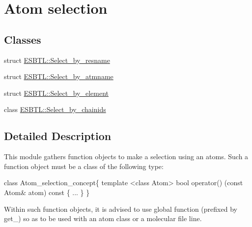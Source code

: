 \hypertarget{group__atomsel}{}\section{Atom selection}
\label{group__atomsel}
\subsection*{Classes}
\begin{DoxyCompactItemize}
\item 
struct \hyperlink{structESBTL_1_1Select__by__resname}{E\+S\+B\+T\+L\+::\+Select\+\_\+by\+\_\+resname}
\item 
struct \hyperlink{structESBTL_1_1Select__by__atmname}{E\+S\+B\+T\+L\+::\+Select\+\_\+by\+\_\+atmname}
\item 
struct \hyperlink{structESBTL_1_1Select__by__element}{E\+S\+B\+T\+L\+::\+Select\+\_\+by\+\_\+element}
\item 
class \hyperlink{classESBTL_1_1Select__by__chainids}{E\+S\+B\+T\+L\+::\+Select\+\_\+by\+\_\+chainids}
\end{DoxyCompactItemize}


\subsection{Detailed Description}
This module gathers function objects to make a selection using an atoms. Such a function object must be a class of the following type\+: 
\begin{DoxyCode}
\textcolor{keyword}{class }Atom\_selection\_concept\{
  \textcolor{keyword}{template} <\textcolor{keyword}{class} Atom>
  \textcolor{keywordtype}{bool} operator() (\textcolor{keyword}{const} Atom& atom)\textcolor{keyword}{ const}
\textcolor{keyword}{  }\{ ... \}  
\}
\end{DoxyCode}
 Within such function objects, it is advised to use global function (prefixed by {\ttfamily get\+\_\+}) so as to be used with an atom class or a molecular file line. 